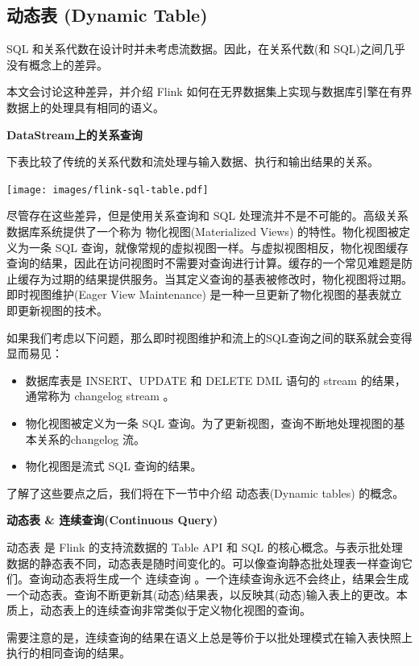 \documentclass[cn,11pt,chinese]{elegantbook}
\providecommand{\tightlist}{%
  \setlength{\itemsep}{0pt}\setlength{\parskip}{0pt}}
\begin{document}
\hypertarget{ux52a8ux6001ux8868-dynamic-table}{%
\subsection{动态表 (Dynamic
Table)}\label{ux52a8ux6001ux8868-dynamic-table}}

SQL 和关系代数在设计时并未考虑流数据。因此，在关系代数(和
SQL)之间几乎没有概念上的差异。

本文会讨论这种差异，并介绍 Flink
如何在无界数据集上实现与数据库引擎在有界数据上的处理具有相同的语义。

\textbf{DataStream上的关系查询}

下表比较了传统的关系代数和流处理与输入数据、执行和输出结果的关系。

\texttt{[image: images/flink-sql-table.pdf]}

尽管存在这些差异，但是使用关系查询和 SQL
处理流并不是不可能的。高级关系数据库系统提供了一个称为
物化视图(Materialized Views) 的特性。物化视图被定义为一条 SQL
查询，就像常规的虚拟视图一样。与虚拟视图相反，物化视图缓存查询的结果，因此在访问视图时不需要对查询进行计算。缓存的一个常见难题是防止缓存为过期的结果提供服务。当其定义查询的基表被修改时，物化视图将过期。
即时视图维护(Eager View Maintenance)
是一种一旦更新了物化视图的基表就立即更新视图的技术。

如果我们考虑以下问题，那么即时视图维护和流上的SQL查询之间的联系就会变得显而易见：

\begin{itemize}
\tightlist
\item
  数据库表是 INSERT、UPDATE 和 DELETE DML 语句的 stream 的结果，通常称为
  changelog stream 。
\item
  物化视图被定义为一条 SQL
  查询。为了更新视图，查询不断地处理视图的基本关系的changelog 流。
\item
  物化视图是流式 SQL 查询的结果。
\end{itemize}

了解了这些要点之后，我们将在下一节中介绍 动态表(Dynamic tables) 的概念。

\textbf{动态表 \& 连续查询(Continuous Query)}

动态表 是 Flink 的支持流数据的 Table API 和 SQL
的核心概念。与表示批处理数据的静态表不同，动态表是随时间变化的。可以像查询静态批处理表一样查询它们。查询动态表将生成一个
连续查询
。一个连续查询永远不会终止，结果会生成一个动态表。查询不断更新其(动态)结果表，以反映其(动态)输入表上的更改。本质上，动态表上的连续查询非常类似于定义物化视图的查询。

需要注意的是，连续查询的结果在语义上总是等价于以批处理模式在输入表快照上执行的相同查询的结果。
\end{document}
